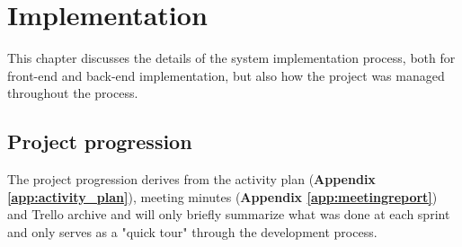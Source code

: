 
\chapter{Implementation}

This chapter discusses the details of the system implementation process, both for front-end and back-end implementation, but also how the project was managed throughout the process.


\section{Project progression}
The project progression derives from the activity plan (\textbf{Appendix \ref{app:activity_plan}}), meeting minutes (\textbf{Appendix \ref{app:meetingreport}}) and Trello archive and will only briefly summarize what was done at each sprint and only serves as a "quick tour" through the development process.

